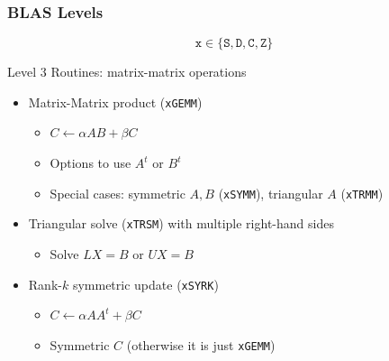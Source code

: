 \documentclass[xcolor={rgb,x11names,svgnames},rgb,x11names,svgnames]{beamer}
\newcommand{\red}{\alert}
\begin{document}
\begin{frame}[label=blas]
  \frametitle{BLAS Levels}

  \[
    \texttt{x} \in \{ \texttt{S}, \texttt{D}, \texttt{C}, \texttt{Z} \}
  \]
  
  \begin{block}{Level 3 Routines: \red{matrix-matrix} operations}
    \begin{itemize}
    \item Matrix-Matrix product (\texttt{xGEMM}) 
      \begin{itemize}
      \item $C \gets \alpha AB + \beta C$
      \item Options to use $A^t$ or $B^t$
      \item Special cases: symmetric $A,B$ (\texttt{xSYMM}), triangular $A$ (\texttt{xTRMM})
      \end{itemize}

      \medskip
      
    \item Triangular solve (\texttt{xTRSM}) with multiple right-hand sides
      \begin{itemize}
      \item Solve $LX = B$ or $UX = B$
      \end{itemize}

      \medskip
      
    \item Rank-$k$ symmetric update (\texttt{xSYRK})
      \begin{itemize}
      \item $C \gets \alpha AA^t + \beta C$ 
      \item Symmetric $C$ (otherwise it is just \texttt{xGEMM})
      \end{itemize}
    \end{itemize}
  \end{block}
\end{frame}

\end{document}
